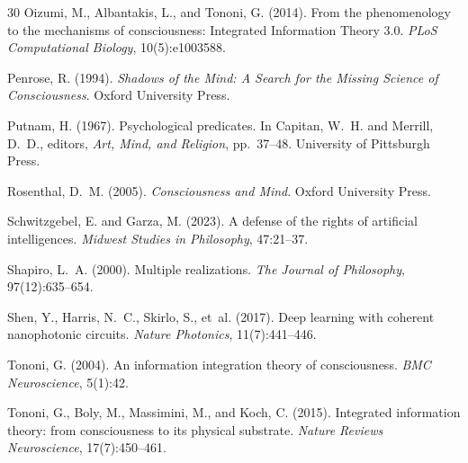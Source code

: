 \documentclass[12pt,a4paper]{article}
\begin{document}
\begin{thebibliography}{30}
Oizumi, M., Albantakis, L., and Tononi, G. (2014).
\newblock From the phenomenology to the mechanisms of consciousness: Integrated Information Theory 3.0.
\newblock \emph{PLoS Computational Biology}, 10(5):e1003588.

Penrose, R. (1994).
\newblock \emph{Shadows of the Mind: A Search for the Missing Science of Consciousness}.
\newblock Oxford University Press.

Putnam, H. (1967).
\newblock Psychological predicates.
\newblock In Capitan, W.~H. and Merrill, D.~D., editors, \emph{Art, Mind, and Religion}, pp.\ 37--48.
\newblock University of Pittsburgh Press.

Rosenthal, D.~M. (2005).
\newblock \emph{Consciousness and Mind}.
\newblock Oxford University Press.

Schwitzgebel, E. and Garza, M. (2023).
\newblock A defense of the rights of artificial intelligences.
\newblock \emph{Midwest Studies in Philosophy}, 47:21--37.

Shapiro, L.~A. (2000).
\newblock Multiple realizations.
\newblock \emph{The Journal of Philosophy}, 97(12):635--654.

Shen, Y., Harris, N.~C., Skirlo, S., et~al. (2017).
\newblock Deep learning with coherent nanophotonic circuits.
\newblock \emph{Nature Photonics}, 11(7):441--446.

Tononi, G. (2004).
\newblock An information integration theory of consciousness.
\newblock \emph{BMC Neuroscience}, 5(1):42.

Tononi, G., Boly, M., Massimini, M., and Koch, C. (2015).
\newblock Integrated information theory: from consciousness to its physical substrate.
\newblock \emph{Nature Reviews Neuroscience}, 17(7):450--461.

\end{thebibliography}
\end{document}
